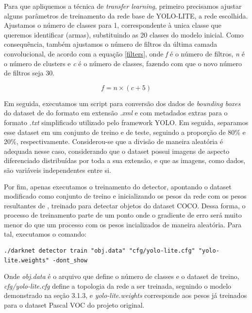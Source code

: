\documentclass[]{politex}
\begin{document}
Para que apliquemos a técnica de \textit{transfer learning}, primeiro precisamos ajustar alguns parâmetros de treinamento da rede base de YOLO-LITE, a rede escolhida. Ajustamos o número de classes para 1, correspondente à unica classe que queremos identificar (armas), substituindo as 20 classes do modelo inicial. Como consequência, também ajustamos o número de filtros da última camada convolucional, de acordo com a equação \ref{filters}, onde \textit{f} é o número de filtros, \textit{n} é o número de clusters e \textit{c} é o número de classes, fazendo com que o novo número de filtros seja 30.

\begin{equation}
  f = n \times (c + 5)
  \label{filters}
\end{equation}

Em seguida, executamos um script para conversão dos dados de \textit{bounding boxes} do dataset de \citeyear{olmos1} \citeauthor{olmos1} do formato em extensão \textit{.xml} e com metadados extras para o formato \textit{.txt} simplificado utilizado pelo framework YOLO. Em seguida, separamos esse dataset em um conjunto de treino e de teste, seguindo a proporção de 80\% e 20\%, respectivamente. Considerou-se que a divisão de maneira aleatória é adequada nesse caso, considerando que o dataset possui imagens de aspecto diferenciado distribuídas por toda a sua extensão, e que as imagens, como dados, são variáveis independentes entre si.

Por fim, apenas executamos o treinamento do detector, apontando o dataset modificado como conjunto de treino e inicializando os pesos da rede com os pesos resultantes de \citeyear{yololite} \citeauthor{yololite}, treinado para detectar objetos do dataset COCO\cite{coco}. Dessa forma, o processo de treinamento parte de um ponto onde o gradiente de erro será muito menor do que um processo com os pesos incializados de maneira aleatória. Para tal, executamos o comando:

\begin{lstlisting}
./darknet detector train "obj.data" "cfg/yolo-lite.cfg" "yolo-lite.weights" -dont_show
\end{lstlisting}

Onde \textit{obj.data} é o arquivo que define o número de classes e o dataset de treino, \textit{cfg/yolo-lite.cfg} define a topologia da rede a ser treinada, seguindo o modelo demonstrado na seção 3.1.3, e \textit{yolo-lite.weights} corresponde aos pesos já treinados para o dataset Pascal VOC do projeto original.
\end{document}
